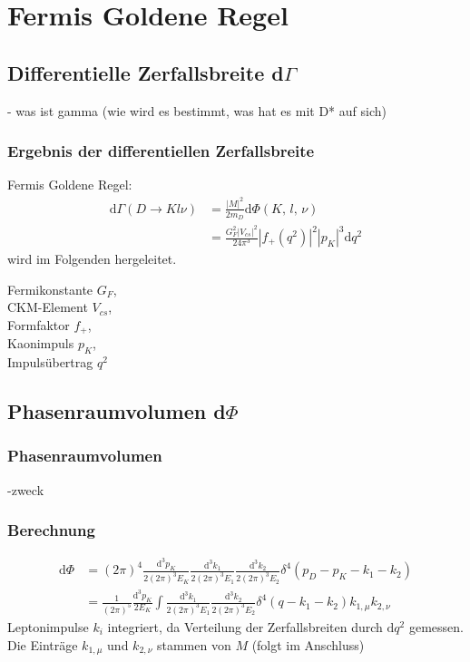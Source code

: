 \documentclass[hyperref={pdfpagelabels=false}]{beamer}
\begin{document}
\section{Fermis Goldene Regel}
\begin{frame}
\tableofcontents[currentsection]
\end{frame}
\subsection{Differentielle Zerfallsbreite d$\Gamma$}
\begin{frame}
- was ist gamma (wie wird es bestimmt, was hat es mit D* auf sich)
\end{frame}

\begin{frame}
\frametitle{Ergebnis der differentiellen Zerfallsbreite}
Fermis Goldene Regel:\\
\begin{align}
\mathrm{d} \Gamma(D\rightarrow Kl\nu) &= \frac{|M|^2}{2m_D} \mathrm{d}\Phi(K,\,l,\,\nu) \nonumber\\
&= \frac{G_F^2 |V_{cs}|^2}{24\pi^3}|f_+(q^2)|^2|p_K|^3\mathrm{d}q^2
\label{eq_theoGamma}
\end{align}
wird im Folgenden hergeleitet.
\vspace{0.5cm}

\small{Fermikonstante $G_F$,\\ CKM-Element $V_{cs}$,\\ Formfaktor $f_+$,\\Kaonimpuls $p_K$,\\ Impuls\"ubertrag $q^2$}
\end{frame}



\subsection{Phasenraumvolumen d$\Phi$}
\begin{frame}
\frametitle{Phasenraumvolumen}
-zweck
\end{frame}

\begin{frame}
 \frametitle{Berechnung}
 \begin{align}
 \mathrm{d} \Phi & = (2\pi)^4\frac{\mathrm{d}^3p_K}{2(2\pi)^3E_K} \frac{\mathrm{d}^3k_1}{2(2\pi)^3E_1} \frac{\mathrm{d}^3k_2}{2(2\pi)^3E_2}\delta^4(p_D-p_K-k_1-k_2)\nonumber\\
 &=\frac{1}{(2\pi)^5}\frac{\mathrm{d}^3p_K}{2E_K}\int \frac{\mathrm{d}^3k_1}{2(2\pi)^3E_1} \frac{\mathrm{d}^3k_2}{2(2\pi)^3E_2}\delta^4(q-k_1-k_2)k_{1,\mu} k_{2,\nu}\nonumber
 \end{align}
Leptonimpulse $k_i$ integriert, da Verteilung der Zerfallsbreiten durch $\mathrm{d}q^2$ gemessen. Die Eintr\"age $k_{1,\mu}$ und $k_{2,\nu}$ stammen von $M$ (folgt im Anschluss)
\end{frame}
\end{document}
